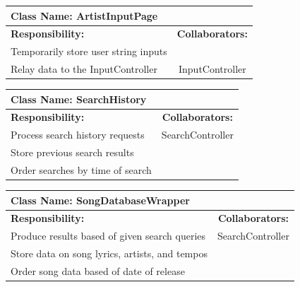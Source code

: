 \documentclass[]{article}
\begin{document}
	\begin{table}[a]
		\centering
		\begin{tabular}{| p{8cm} | c |} \hline
			\multicolumn{2}{|l|}{\textbf{Class Name: ArtistInputPage}} \\ \hline
			\textbf{Responsibility:} & \textbf{Collaborators:} \\ \hline
			Temporarily store user string inputs &   \\ \hline
			Relay data to the InputController & InputController \\ \hline
		\end{tabular}
	\end{table}
	
	\begin{table}[a]
		\centering
		\begin{tabular}{| p{8cm} | c |} \hline
			\multicolumn{2}{|l|}{\textbf{Class Name: SearchHistory}} \\ \hline
			\textbf{Responsibility:} & \textbf{Collaborators:} \\ \hline
			Process search history requests & SearchController \\ \hline
			Store previous search results &   \\ \hline
			Order searches by time of search &   \\ \hline
		\end{tabular}
	\end{table}
	
	\begin{table}[a]
		\centering
		\begin{tabular}{| p{8cm} | c |} \hline
			\multicolumn{2}{|l|}{\textbf{Class Name: SongDatabaseWrapper}} \\ \hline
			\textbf{Responsibility:} & \textbf{Collaborators:} \\ \hline
			Produce results based of given search queries & SearchController \\ \hline
			Store data on song lyrics, artists, and tempos &   \\ \hline
			Order song data based of date of release &   \\ \hline
		\end{tabular}
	\end{table}
	
\end{document}
